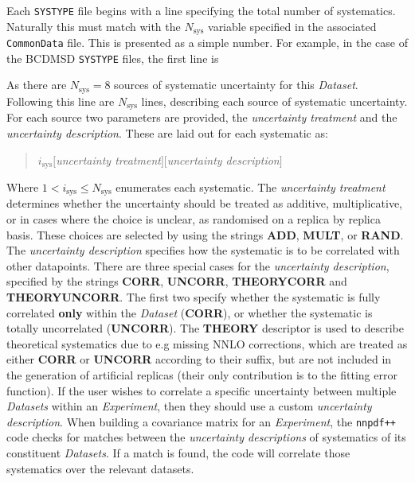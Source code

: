 \documentclass[11pt]{article}
\begin{document}
Each {\tt SYSTYPE} file begins with a line specifying the total number of systematics. Naturally this must match with the $N_{\text{sys}}$ variable specified in the associated {\tt CommonData} file. This is presented as a simple number. For example, in the case of the BCDMSD {\tt SYSTYPE} files, the first line is
\begin{quotation}
\end{quotation}
As there are $N_{\text{sys}}=8$ sources of systematic uncertainty for this \emph{Dataset}. Following this line are $N_{\text{sys}}$ lines, describing each source of systematic uncertainty. For each source two parameters are provided, the \emph{uncertainty treatment} and the \emph{uncertainty description}. These are laid out for each systematic as:
\begin{quotation}\noindent
$i_{\text{sys}}$\quad $[$\emph{uncertainty treatment}$]$\quad $[$\emph{uncertainty description}$]$
\end{quotation}
Where $1< i_{\text{sys}} \leq N_{\mathrm{sys}}$ enumerates each systematic. The \emph{uncertainty treatment} determines whether the uncertainty should be treated as additive, multiplicative, or in cases where the choice is unclear, as randomised on a replica by replica basis. These choices are selected by using the strings \textbf{ADD}, \textbf{MULT}, or \textbf{RAND}. The \emph{uncertainty description} specifies how the systematic is to be correlated with other datapoints. There are three special cases for the \emph{uncertainty description}, specified by the strings \textbf{CORR}, \textbf{UNCORR}, \textbf{THEORYCORR} and \textbf{THEORYUNCORR}. The first two specify whether the systematic is fully correlated \textbf{only} within the \emph{Dataset} (\textbf{CORR}), or whether the systematic is totally uncorrelated (\textbf{UNCORR}). The \textbf{THEORY} descriptor is used to describe theoretical systematics due to e.g missing NNLO corrections, which are treated as either \textbf{CORR} or \textbf{UNCORR} according to their suffix, but are not included in the generation of artificial replicas (their only contribution is to the fitting error function). If the user wishes to correlate a specific uncertainty between multiple \emph{Datasets} within an \emph{Experiment}, then they should use a custom \emph{uncertainty description}. When building a covariance matrix for an \emph{Experiment}, the {\tt nnpdf++} code checks for matches between the \emph{uncertainty descriptions} of systematics of its constituent \emph{Datasets}. If a match is found, the code will correlate those systematics over the relevant datasets.
\end{document}

